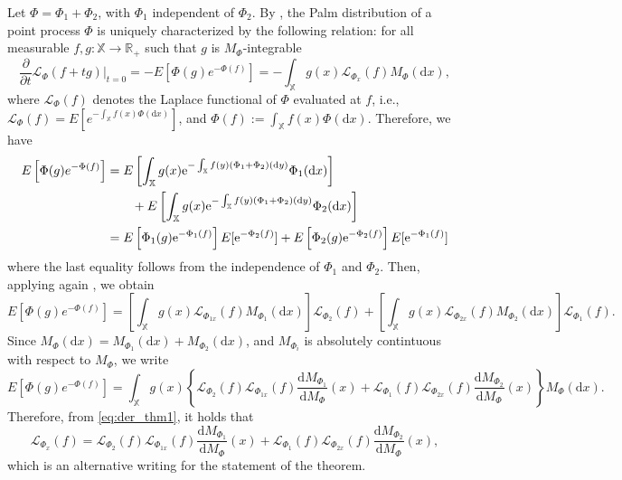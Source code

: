 \documentclass[11pt,a4paper,oneside]{article}
\newcommand{\e}{{\rm e}}
\newcommand{\dd}{\mathrm d}
\newcommand{\partder}[1]{\frac{\partial}{ \partial #1}}
\newcommand{\E}{E}
\newcommand{\X}{\mathbb{X}}
\newcommand{\R}{\mathbb{R}}
\theoremstyle{definition}
\theoremstyle{remark}
\begin{document}
Let $\Phi = \Phi_1 + \Phi_2$, with $\Phi_1$ independent of $\Phi_2$. By \citep[Proposition 3.2.1]{BaBlaKa}, the Palm distribution of a point process $\Phi$ is uniquely characterized by the following relation: for all measurable $f, g: \X \rightarrow \R_+$ such that $g$ is $M_{\Phi}$-integrable
    \begin{equation}\label{eq:der_thm1}
        \partder{t} \mathcal{L}_{\Phi}(f + t g)|_{t = 0} =  - \E\left[ \Phi(g) e^{-\Phi(f)} \right] =  - \int_{\X} g(x) \mathcal{L}_{\Phi_x}(f) M_{\Phi}(\dd x),
    \end{equation}
    where $\mathcal{L}_{\Phi}(f)$ denotes the Laplace functional of $\Phi$ evaluated at $f$, i.e., $\mathcal{L}_{\Phi}(f) = \E\left[e^{- \int_{\X} f(x) \Phi(\dd x)}\right]$, and $\Phi(f) := \int_{\X} f(x) \Phi(\dd x)$.
    Therefore, we have
    \begin{align*}
        \E\left[ \Phi(g) e^{-\Phi(f)} \right] &= \E\left[ \int_{\X} g(x) \e^{-\int_{\X} f(y) (\Phi_1 + \Phi_2)(\dd y)} \Phi_1(\dd x) \right] \\
        & \qquad + \E\left[ \int_{\X} g(x) \e^{-\int_{\X} f(y) (\Phi_1 + \Phi_2)(\dd y)} \Phi_2(\dd x) \right] \\
        & = \E\left[\Phi_1(g) \e^{-\Phi_1(f)}\right]\E[\e^{-\Phi_2(f)}] +\E\left[\Phi_2(g) \e^{-\Phi_2(f)}\right]\E[\e^{-\Phi_1(f)}]
    \end{align*}
    where the last equality follows from the independence of $\Phi_1$ and $\Phi_2$.
    Then, applying again \citep[Proposition 3.2.1]{BaBlaKa}, we obtain
    \begin{equation*}
       \E\left[ \Phi(g) e^{-\Phi(f)} \right] = 
        \left[\int_{\X} g(x) \mathcal{L}_{\Phi_{1x}}(f) M_{\Phi_1}(\dd x)\right] \mathcal{L}_{\Phi_2}(f) + \left[\int_{\X} g(x) \mathcal{L}_{\Phi_{2x}}(f) M_{\Phi_2}(\dd x)\right] \mathcal{L}_{\Phi_1}(f).
    \end{equation*}
Since $M_\Phi(\dd x) = M_{\Phi_1}(\dd x ) + M_{\Phi_2}(\dd x)$, and $M_{\Phi_i}$ is absolutely contintuous with respect to $M_\Phi$, we write
 \begin{equation*}
       \E\left[ \Phi(g) e^{-\Phi(f)} \right] = 
        \int_{\X} g(x) \left\{ \mathcal{L}_{\Phi_2}(f) \mathcal{L}_{\Phi_{1x}}(f) \frac{\dd M_{\Phi_1}}{\dd M_{\Phi}}(x) + \mathcal{L}_{\Phi_1}(f) \mathcal{L}_{\Phi_{2x}}(f) \frac{\dd M_{\Phi_2}}{\dd M_{\Phi}}(x)\right\} M_\Phi(\dd x).
    \end{equation*}  
    Therefore, from \eqref{eq:der_thm1}, it holds that
    \[
    \mathcal{L}_{\Phi_x}(f) = \mathcal{L}_{\Phi_2}(f) \mathcal{L}_{\Phi_{1x}}(f) \frac{\dd M_{\Phi_1}}{\dd M_{\Phi}}(x) + \mathcal{L}_{\Phi_1}(f) \mathcal{L}_{\Phi_{2x}}(f) \frac{\dd M_{\Phi_2}}{\dd M_{\Phi}}(x),
    \]
    which is an alternative writing for the statement of the theorem.
\end{document}
